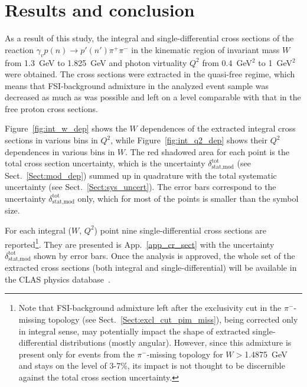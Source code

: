\chapter{Results and conclusion}
\label{Sect:concl}
\vspace{-0.25em}
As a result of this study, the integral and single-differential cross sections of the reaction $\gamma_{v}p(n) \rightarrow p' (n')\pi^{+}\pi^{-}$ in the kinematic region of invariant mass $W$ from 1.3~GeV to 1.825~GeV and photon virtuality $Q^{2}$ from 0.4~GeV$^2$ to 1~GeV$^2$ were obtained. The cross sections were extracted in the quasi-free regime, which means that FSI-background admixture in the analyzed event sample was decreased as much as was possible and left on a level comparable with that in the free proton cross sections.





Figure~\ref{fig:int_w_dep} shows the $W$ dependences of the extracted integral cross sections in various bins in $Q^{2}$, while Figure~\ref{fig:int_q2_dep} shows their $Q^{2}$ dependences in various bins in $W$. The red shadowed area for each point is the total cross section uncertainty, which is the uncertainty $\delta_{\text{stat,mod}}^{\text{tot}}$ (see Sect.~\ref{Sect:mod_dep}) summed up in quadrature with the total systematic uncertainty (see Sect.~\ref{Sect:sys_uncert}). The error bars correspond to the uncertainty $\delta_{\text{stat,mod}}^{\text{tot}}$ only, which for most of the points is smaller than the symbol size.

For each integral ($W$, $Q^{2}$) point nine single-differential cross sections are reported\footnote[1]{Note that FSI-background admixture left after the exclusivity cut in the $\pi^{-}$-missing topology (see Sect.~\ref{Sect:excl_cut_pim_miss}), being corrected only in integral sense, may potentially impact the shape of extracted single-differential distributions (mostly angular). However, since this admixture is present only for events from the $\pi^{-}$-missing topology for $W>$1.4875~GeV and stays on the level of 3-7\%, its impact is not thought to be discernible against the total cross section uncertainty.}. They are presented is App.~\ref{app_cr_sect} with the uncertainty $\delta_{\text{stat,mod}}^{\text{tot}}$ shown by error bars. Once the analysis is approved, the whole set of the extracted cross sections (both integral and single-differential) will be available in the CLAS physics database~\cite{CLAS_DB}.


